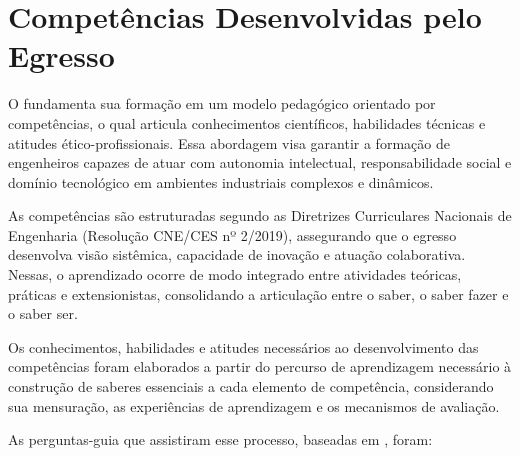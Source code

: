 \section{Competências Desenvolvidas pelo Egresso}

O \NOMECURSO fundamenta sua formação em um modelo pedagógico orientado por competências, o qual articula conhecimentos científicos, habilidades técnicas e atitudes ético-profissionais. Essa abordagem visa garantir a formação de engenheiros capazes de atuar com autonomia intelectual, responsabilidade social e domínio tecnológico em ambientes industriais complexos e dinâmicos.  

As competências são estruturadas segundo as Diretrizes Curriculares Nacionais de Engenharia (Resolução CNE/CES nº 2/2019), assegurando que o egresso desenvolva visão sistêmica, capacidade de inovação e atuação colaborativa. Nessas, o aprendizado ocorre de modo integrado entre atividades teóricas, práticas e extensionistas, consolidando a articulação entre o saber, o saber fazer e o saber ser.  

Os conhecimentos, habilidades e atitudes necessários ao desenvolvimento das
competências foram elaborados a partir do percurso de aprendizagem necessário à construção de saberes essenciais a cada elemento de competência, considerando sua mensuração, as experiências de aprendizagem e os mecanismos de avaliação.

As perguntas-guia que assistiram esse processo, baseadas em \cite{res259}, foram:

